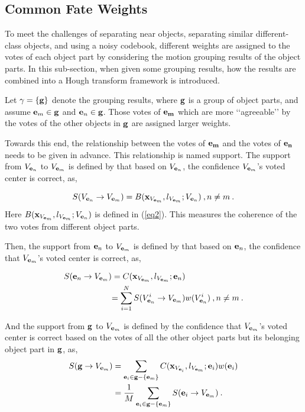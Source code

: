 \subsection{Common Fate Weights}

To meet the challenges of separating near objects, separating similar different-class objects, and using a noisy codebook,  different weights are assigned to the votes of each object part by considering the motion grouping results of the object parts. In this sub-section, when given some grouping results, how the results are combined into a Hough transform framework is introduced.

Let $\gamma=\{\bf{g}\}$ denote the grouping results, where $\bf{g}$ is a group of object parts, and assume ${{\bf{e}}_m}\in \bf{g}$ and ${{\bf{e}}_n}\in \bf{g}$. Those votes of ${\bf{e}_m}$ which are more {\lq\lq}agreeable{\rq\rq} by the votes of the other objects in $\bf{g}$ are assigned larger weights.

Towards this end, the relationship between the votes of $\bf{e}_m$ and the votes of $\bf{e}_n$ needs to be given in advance. This relationship is named support. The support from ${V_{{{\bf{e}}_n}}}$ to ${V_{{{\bf{e}}_m}}}$ is defined by that based on ${V_{{{\bf{e}}_n}}}$, the confidence ${V_{{{\bf{e}}_m}}}$'s voted center is correct, as,


\[
S({V_{{{\bf{e}}_n}}} \to {V_{{{\bf{e}}_m}}})  =  B({\bf{x}}_{V_{{{\bf{e}}_m}}},l_{V_{{{\bf{e}}_m}}};{V_{{{\bf{e}}_n}}})\:,n \ne m\:.
\]
Here $B({\bf{x}}_{V_{{{\bf{e}}_m}}},l_{V_{{{\bf{e}}_m}}};{V_{{{\bf{e}}_n}}})$ is defined in (\ref{eq2}). This measures the coherence of the two votes from different object parts.

Then, the support from ${{\bf{e}}_n}$ to ${V_{{{\bf{e}}_m}}}$ is defined by that based on ${{\bf{e}}_n}$, the confidence that $V_{{{\bf{e}}_m}}$'s voted center is correct, as,

\[
\begin{aligned}
S({{{\bf{e}}_n} \to {V_{{{\bf{e}}_m}}}}) &= C({\bf{x}}_{V_{{{\bf{e}}_m}}},l_{V_{{{\bf{e}}_m}}};{{{\bf{e}}_n}})\\
& {
=\sum\limits^N_{i=1} {S({{V^i_{{{\bf{e}}_n}}} \to {V_{{{\bf{e}}_m}}}})w(V^i_{{\bf{e}}_n})}\:,n \ne m\:.
}
\end{aligned}
\]

And the support from ${\bf{g}}$ to $V_{{\bf{e}}_m}$ is defined by the confidence that $V_{{\bf{e}}_m}$'s voted center is correct based on the votes of all the other object parts but its belonging object part in $\bf{g}$, as,
\[
\begin{aligned}
S({\bf{g}} \to V_{{\bf{e}}_m})
&= \sum\limits_{{{\bf{e}}_i} \in {\bf{g}}- \{ {{\bf{e}}_m} \} }{C({\bf{x}}_{V_{{{\bf{e}}_i}}},l_{V_{{{\bf{e}}_m}}};{{{\bf{e}}_i}})w({{\bf{e}}_i})}\\
& =\frac 1 M  \sum\limits_{{{\bf{e}}_i} \in {\bf{g}}- \{ {{\bf{e}}_m} \}} {S({{{\bf{e}}_i} \to {V_{{{\bf{e}}_m}}}})} \:.
\end{aligned}
\]

